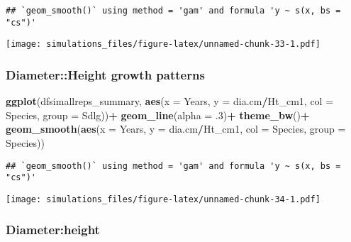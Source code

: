 \documentclass[]{article}
\newenvironment{Shaded}{\begin{snugshade}}{\end{snugshade}}
\newcommand{\KeywordTok}[1]{\textcolor[rgb]{0.13,0.29,0.53}{\textbf{#1}}}
\newcommand{\DataTypeTok}[1]{\textcolor[rgb]{0.13,0.29,0.53}{#1}}
\newcommand{\DecValTok}[1]{\textcolor[rgb]{0.00,0.00,0.81}{#1}}
\newcommand{\StringTok}[1]{\textcolor[rgb]{0.31,0.60,0.02}{#1}}
\newcommand{\OperatorTok}[1]{\textcolor[rgb]{0.81,0.36,0.00}{\textbf{#1}}}
\newcommand{\NormalTok}[1]{#1}
\begin{document}
\begin{verbatim}
## `geom_smooth()` using method = 'gam' and formula 'y ~ s(x, bs = "cs")'
\end{verbatim}

\texttt{[image: simulations\_files/figure-latex/unnamed-chunk-33-1.pdf]}

\subsubsection{Diameter::Height growth
patterns}\label{diameterheight-growth-patterns-1}

\begin{Shaded}
\begin{Highlighting}[]
\KeywordTok{ggplot}\NormalTok{(dfsimallreps_summary, }\KeywordTok{aes}\NormalTok{(}\DataTypeTok{x =}\NormalTok{ Years, }\DataTypeTok{y =}\NormalTok{ dia.cm}\OperatorTok{/}\NormalTok{Ht_cm1, }\DataTypeTok{col =}\NormalTok{ Species, }\DataTypeTok{group =}\NormalTok{ Sdlg))}\OperatorTok{+}
\StringTok{  }\KeywordTok{geom_line}\NormalTok{(}\DataTypeTok{alpha =}\NormalTok{ .}\DecValTok{3}\NormalTok{)}\OperatorTok{+}
\StringTok{  }\KeywordTok{theme_bw}\NormalTok{()}\OperatorTok{+}
\StringTok{  }\KeywordTok{geom_smooth}\NormalTok{(}\KeywordTok{aes}\NormalTok{(}\DataTypeTok{x =}\NormalTok{ Years, }\DataTypeTok{y =}\NormalTok{ dia.cm}\OperatorTok{/}\NormalTok{Ht_cm1, }\DataTypeTok{col =}\NormalTok{ Species, }\DataTypeTok{group =}\NormalTok{ Species))}
\end{Highlighting}
\end{Shaded}

\begin{verbatim}
## `geom_smooth()` using method = 'gam' and formula 'y ~ s(x, bs = "cs")'
\end{verbatim}

\texttt{[image: simulations\_files/figure-latex/unnamed-chunk-34-1.pdf]}

\subsubsection{Diameter:height}\label{diameterheight-1}

\begin{Shaded}
\end{Shaded}
\end{document}
